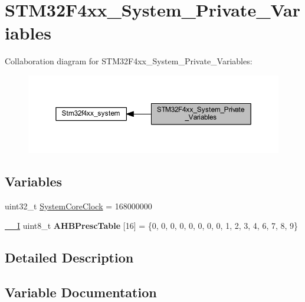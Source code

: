 \hypertarget{group___s_t_m32_f4xx___system___private___variables}{}\section{S\+T\+M32\+F4xx\+\_\+\+System\+\_\+\+Private\+\_\+\+Variables}
\label{group___s_t_m32_f4xx___system___private___variables}
Collaboration diagram for S\+T\+M32\+F4xx\+\_\+\+System\+\_\+\+Private\+\_\+\+Variables\+:\nopagebreak
\begin{figure}[H]
\begin{center}
\leavevmode
\includegraphics[width=350pt]{group___s_t_m32_f4xx___system___private___variables}
\end{center}
\end{figure}
\subsection*{Variables}
\begin{DoxyCompactItemize}
\item 
uint32\+\_\+t \hyperlink{group___s_t_m32_f4xx___system___private___variables_gaa3cd3e43291e81e795d642b79b6088e6}{System\+Core\+Clock} = 168000000
\item 
\mbox{\label{group___s_t_m32_f4xx___system___private___variables_gacdc3ef54c0704c90e69a8a84fb2d970d}} 
\hyperlink{group___c_m_s_i_s__core__definitions_gaf63697ed9952cc71e1225efe205f6cd3}{\+\_\+\+\_\+I} uint8\+\_\+t {\bfseries A\+H\+B\+Presc\+Table} \mbox{[}16\mbox{]} = \{0, 0, 0, 0, 0, 0, 0, 0, 1, 2, 3, 4, 6, 7, 8, 9\}
\end{DoxyCompactItemize}


\subsection{Detailed Description}


\subsection{Variable Documentation}
\mbox{\label{group___s_t_m32_f4xx___system___private___variables_gaa3cd3e43291e81e795d642b79b6088e6}} 
